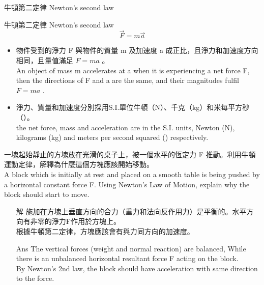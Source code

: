 \documentclass[beamer=true]{standalone}
\begin{document}
\begin{frame}{牛頓第二定律 Newton's second law}
    \begin{alertblock}
        {牛頓第二定律 Newton's second law}
        \begin{equation}
            \vec{F}=m\vec{a}
        \end{equation}
    \end{alertblock}
    \begin{itemize}

        \item 物件受到的淨力 F 與物件的質量 m 及加速度 a 成正比，且淨力和加速度方向相同，且量值滿足 $F=m a$ 。 \\An object of mass m accelerates at a when it is experiencing a net force F, then the directions of F and a are the same, and their magnitudes fulfil $F=m a$ .
        \item 淨力、質量和加速度分別採用S.I.單位牛頓（N）、千克（kg）和米每平方秒（\acc{}）。 \\the net force, mass and acceleration are in the S.I. units, Newton (N), kilograms (kg) and meters per second squared (\acc{}) respectively.
    \end{itemize}
\end{frame}

\begin{eg}
    一塊起始靜止的方塊放在光滑的桌子上，被一個水平的恆定力 F 推動。利用牛頓運動定律，解釋為什麼這個方塊應該開始移動。\\A block which is initially at rest and placed on a smooth table is being pushed by a horizontal constant force F. Using Newton's Law of Motion, explain why the block should start to move.
    \begin{itemize}
        \item [解] 施加在方塊上垂直方向的合力（重力和法向反作用力）是平衡的。水平方向有非零的淨力F作用於方塊上。\\根據牛頓第二定律，方塊應該會有與力同方向的加速度。
        \item [Ans] The vertical forces (weight and normal reaction) are balanced, While there is an unbalanced horizontal resultant force F acting on the block.\\By Newton's 2nd law, the block should have acceleration with same direction to the force.
    \end{itemize}
\end{eg}
\end{document}
